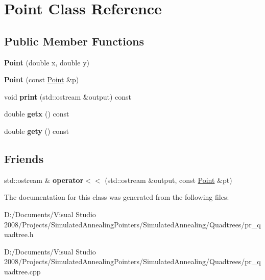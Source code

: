 \hypertarget{class_point}{
\section{Point Class Reference}
\label{class_point}
}
\subsection*{Public Member Functions}
\begin{DoxyCompactItemize}
\item 
\hypertarget{class_point_a78b55e8d5466bb8c2cf60fa55f2562ff}{
{\bfseries Point} (double x, double y)}
\label{class_point_a78b55e8d5466bb8c2cf60fa55f2562ff}

\item 
\hypertarget{class_point_af0c0f20db1616447bc78184ed537ef6e}{
{\bfseries Point} (const \hyperlink{class_point}{Point} \&p)}
\label{class_point_af0c0f20db1616447bc78184ed537ef6e}

\item 
\hypertarget{class_point_a7d32b4ef8b56f4926e640cb8164358a7}{
void {\bfseries print} (std::ostream \&output) const }
\label{class_point_a7d32b4ef8b56f4926e640cb8164358a7}

\item 
\hypertarget{class_point_a78f370df98ce3a3ccca1dff2820cc2c3}{
double {\bfseries getx} () const }
\label{class_point_a78f370df98ce3a3ccca1dff2820cc2c3}

\item 
\hypertarget{class_point_ae683ebf99ac67f924b87a5137fd1cf3f}{
double {\bfseries gety} () const }
\label{class_point_ae683ebf99ac67f924b87a5137fd1cf3f}

\end{DoxyCompactItemize}
\subsection*{Friends}
\begin{DoxyCompactItemize}
\item 
\hypertarget{class_point_a411d916f99d34bc90a18db8e07185aad}{
std::ostream \& {\bfseries operator$<$$<$} (std::ostream \&output, const \hyperlink{class_point}{Point} \&pt)}
\label{class_point_a411d916f99d34bc90a18db8e07185aad}

\end{DoxyCompactItemize}


The documentation for this class was generated from the following files:\begin{DoxyCompactItemize}
\item 
D:/Documents/Visual Studio 2008/Projects/SimulatedAnnealingPointers/SimulatedAnnealing/Quadtrees/pr\_\-quadtree.h\item 
D:/Documents/Visual Studio 2008/Projects/SimulatedAnnealingPointers/SimulatedAnnealing/Quadtrees/pr\_\-quadtree.cpp\end{DoxyCompactItemize}
